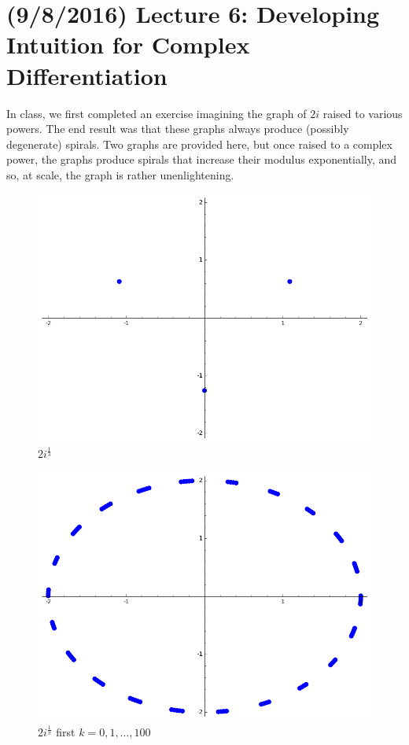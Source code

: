 \documentclass[11pt,leqno,oneside]{amsart}
\numberwithin{thm}{section}
\begin{document}
    \section{(9/8/2016) Lecture 6: Developing Intuition for Complex Differentiation}
    In class, we first completed an exercise imagining the graph of $2i$
    raised to various powers. The end result was that these graphs always
    produce (possibly degenerate) spirals. Two graphs are provided here,
    but once raised to a complex power, the graphs produce spirals that
    increase their modulus exponentially, and so, at scale, the graph is rather
    unenlightening.

    \begin{figure}[h]
        \centering
        \includegraphics[scale=0.2]{2i-to-one-third.png}
        \caption{$2i^{\frac{1}{3}}$}
        \label{fig:2i13}
    \end{figure}
    \begin{figure}[h]
        \centering
        \includegraphics[scale=0.2]{2i-to-1-over-pi.png}
        \caption{$2i^{\frac{1}{\pi}}$ first $k = 0,1, \ldots, 100$}
        \label{fig:2i1pi}
    \end{figure}
\end{document}
